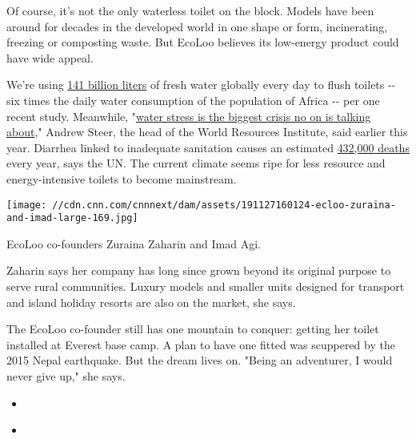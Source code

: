 Of course, it's not the only waterless toilet on the block. Models have
been around for decades in the developed world in one shape or form,
incinerating, freezing or composting waste. But EcoLoo believes its
low-energy product could have wide appeal.

We're using
\href{https://www.nature.com/articles/s41893-019-0421-0.epdf?referrer_access_token=E_Imd7iMiVMlprJcefMIXNRgN0jAjWel9jnR3ZoTv0N5Xw8IDd-Asry561MF3ivMZK1u_utbK8_AUGRTX0RH_-s10f9uIc-jsV2mLL47XfXUTtlxzOjm4R_aR0CZkYTvmlX6u7fO5oaH_O1RU0Ixtg-O7YrgZvZXkkXE369_LONGIfumOWEbms1IVsJI4UmVr7-dutndGfnekAw8uI3No_rEozWiXF62B2RTISVZpwtJuLQoNvFPJ-sFuUvLsAkfqQgW62Gjs04hGhZ7Eagpq4RWoM1jLE-Go1gcDO9Y5XxNVKpFncEYCrQw13ofXQST}{141
billion liters} of fresh water globally every day to flush toilets -\/-
six times the daily water consumption of the population of Africa -\/-
per one recent study. Meanwhile,
"\href{https://cnn.com/2019/08/06/world/aqueduct-water-climate-crisis-intl-scli/index.html}{water
stress is the biggest crisis no on is talking about}," Andrew Steer, the
head of the World Resources Institute, said earlier this year. Diarrhea
linked to inadequate sanitation causes an estimated
\href{https://www.un.org/en/events/toiletday/assets/pdf/WTD2019_factsheet_2019.pdf}{432,000
deaths} every year, says the UN. The current climate seems ripe for less
resource and energy-intensive toilets to become mainstream.

\texttt{[image: //cdn.cnn.com/cnnnext/dam/assets/191127160124-ecloo-zuraina-and-imad-large-169.jpg]}

EcoLoo co-founders Zuraina Zaharin and Imad Agi.

Zaharin says her company has long since grown beyond its original
purpose to serve rural communities. Luxury models and smaller units
designed for transport and island holiday resorts are also on the
market, she says.

The EcoLoo co-founder still has one mountain to conquer: getting her
toilet installed at Everest base camp. A plan to have one fitted was
scuppered by the 2015 Nepal earthquake. But the dream lives on. "Being
an adventurer, I would never give up," she says.

\begin{itemize}
\item
\end{itemize}

\begin{itemize}
\item
\end{itemize}

